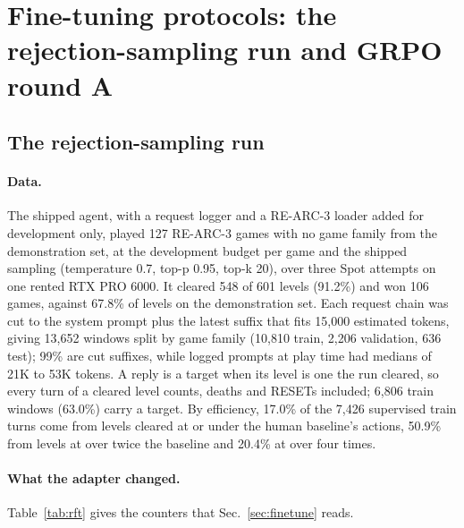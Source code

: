 \section{Fine-tuning protocols: the rejection-sampling run and GRPO round A}\label{app:grpo}

\subsection{The rejection-sampling run}\label{app:rft}

\paragraph{Data.}
The shipped agent, with a request logger and a RE-ARC-3 loader added for development only, played 127 RE-ARC-3 games with no game family from the demonstration set, at the development budget per game and the shipped sampling (temperature 0.7, top-p 0.95, top-k 20), over three Spot attempts on one rented RTX PRO 6000. %
It cleared 548 of 601 levels (91.2\%) and won 106 games, against 67.8\% of levels on the demonstration set. %
Each request chain was cut to the system prompt plus the latest suffix that fits 15,000 estimated tokens, giving 13,652 windows split by game family (10,810 train, 2,206 validation, 636 test); 99\% are cut suffixes, while logged prompts at play time had medians of 21K to 53K tokens. %
A reply is a target when its level is one the run cleared, so every turn of a cleared level counts, deaths and RESETs included; 6,806 train windows (63.0\%) carry a target. %
By efficiency, 17.0\% of the 7,426 supervised train turns come from levels cleared at or under the human baseline's actions, 50.9\% from levels at over twice the baseline and 20.4\% at over four times. %

\paragraph{What the adapter changed.}
Table~\ref{tab:rft} gives the counters that Sec.~\ref{sec:finetune} reads.


